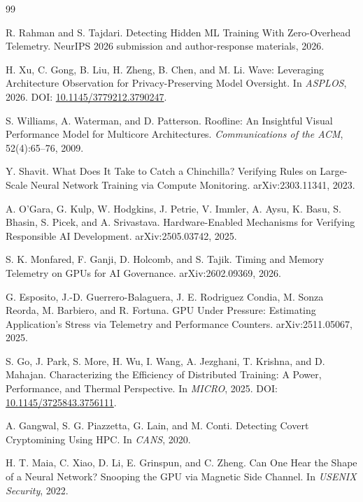\documentclass[sigplan,anonymous,review,nonacm]{acmart}
\begin{document}
\twocolumn
\fi
\begin{thebibliography}{99}
\small

R. Rahman and S. Tajdari. Detecting Hidden ML Training With Zero-Overhead Telemetry. NeurIPS 2026 submission and author-response materials, 2026.

H. Xu, C. Gong, B. Liu, H. Zheng, B. Chen, and M. Li. Wave: Leveraging Architecture Observation for Privacy-Preserving Model Oversight. In \emph{ASPLOS}, 2026. DOI: \href{https://doi.org/10.1145/3779212.3790247}{10.1145/3779212.3790247}.

S. Williams, A. Waterman, and D. Patterson. Roofline: An Insightful Visual Performance Model for Multicore Architectures. \emph{Communications of the ACM}, 52(4):65--76, 2009.

Y. Shavit. What Does It Take to Catch a Chinchilla? Verifying Rules on Large-Scale Neural Network Training via Compute Monitoring. arXiv:2303.11341, 2023.

A. O'Gara, G. Kulp, W. Hodgkins, J. Petrie, V. Immler, A. Aysu, K. Basu, S. Bhasin, S. Picek, and A. Srivastava. Hardware-Enabled Mechanisms for Verifying Responsible AI Development. arXiv:2505.03742, 2025.

S. K. Monfared, F. Ganji, D. Holcomb, and S. Tajik. Timing and Memory Telemetry on GPUs for AI Governance. arXiv:2602.09369, 2026.

G. Esposito, J.-D. Guerrero-Balaguera, J. E. Rodriguez Condia, M. Sonza Reorda, M. Barbiero, and R. Fortuna. GPU Under Pressure: Estimating Application's Stress via Telemetry and Performance Counters. arXiv:2511.05067, 2025.

S. Go, J. Park, S. More, H. Wu, I. Wang, A. Jezghani, T. Krishna, and D. Mahajan. Characterizing the Efficiency of Distributed Training: A Power, Performance, and Thermal Perspective. In \emph{MICRO}, 2025. DOI: \href{https://doi.org/10.1145/3725843.3756111}{10.1145/3725843.3756111}.

A. Gangwal, S. G. Piazzetta, G. Lain, and M. Conti. Detecting Covert Cryptomining Using HPC. In \emph{CANS}, 2020.

H. T. Maia, C. Xiao, D. Li, E. Grinspun, and C. Zheng. Can One Hear the Shape of a Neural Network? Snooping the GPU via Magnetic Side Channel. In \emph{USENIX Security}, 2022.


\end{thebibliography}
\end{document}

